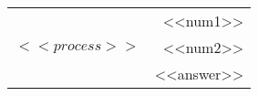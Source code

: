 \begin{tabular}{c r}
     &<<num1>> \tabularnewline
    $<<process>>$&<<num2>> \tabularnewline
    \hline
     &<<answer>> \tabularnewline
    \hline
\end{tabular}
